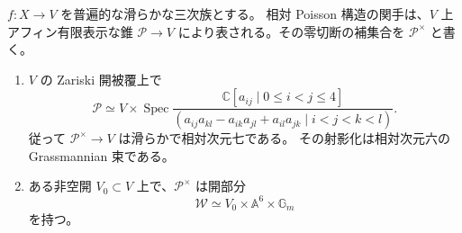 \begin{proposition}[相対Poisson錐の構造]
\label{prop:relative-poisson-cubic-cone}
$f:X\to V$ を普遍的な滑らかな三次族とする。
相対 Poisson 構造の関手は、$V$ 上アフィン有限表示な錐
$\mathcal P\to V$ により表される。その零切断の補集合を
$\mathcal P^\times$ と書く。
\begin{enumerate}
\item $V$ の Zariski 開被覆上で
\[
 \mathcal P\simeq
 V\times\operatorname{Spec}
 \frac{\mathbb C[a_{ij}\mid0\le i<j\le4]}
 {(a_{ij}a_{kl}-a_{ik}a_{jl}+a_{il}a_{jk}\mid i<j<k<l)}.
\]
従って $\mathcal P^\times\to V$ は滑らかで相対次元七である。
その射影化は相対次元六の Grassmannian 束である。
\item ある非空開 $V_0\subset V$ 上で、$\mathcal P^\times$ は開部分
\[
 \mathcal W\simeq V_0\times\mathbb A^6\times\mathbb G_m
\]
を持つ。
\end{enumerate}
\end{proposition}
